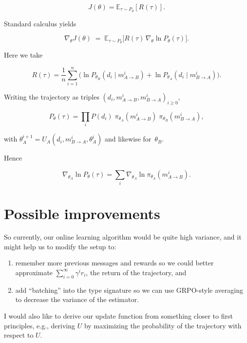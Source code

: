 \documentclass{article}
\theoremstyle{definition}
\begin{document}
$$
J(\theta)=\mathbb{E}_{\tau\sim P_\theta}[R(\tau)] .
$$

Standard calculus yields

$$
\nabla_\theta J(\theta)
\;=\;
\mathbb{E}_{\tau\sim P_\theta}\!\bigl[R(\tau)\,\nabla_\theta\ln P_\theta(\tau)\bigr].
$$

Here we take

$$
R(\tau)=\frac{1}{n}\sum_{i=1}^{n}\!
\bigl(
\ln P_{\theta_B}(d_i\mid m_{A\to B}^i)
+
\ln P_{\theta_A}(d_i\mid m_{B\to A}^i)
\bigr).
$$

Writing the trajectory as triples
$(d_i,m_{A\to B}^i,m_{B\to A}^i)_{i\ge 0}$,

$$
P_\theta(\tau)
=\prod_{i}
P(d_i)\;
\pi_{\theta_A}(m_{A\to B}^i)
\;
\pi_{\theta_B}(m_{B\to A}^i),
$$

with
$\theta_A^{i+1}=U_A(d_i,m_{B\to A}^i,\theta_A^i)$
and likewise for~$\theta_B$.

Hence

$$
\nabla_{\theta_A}\ln P_\theta(\tau)
=\sum_{i}\nabla_{\theta_A}\ln\pi_{\theta_A}(m_{A\to B}^i).
$$

\section{Possible improvements}\label{sec:improvements}

So currently, our online learning algorithm would be quite high variance, and it might help us to modify the setup to:
\begin{enumerate}
\item remember more previous messages and rewards so we could better approximate $\sum_{i=0}^{\infty} \gamma^i r_i$, the return of the trajectory, and 
\item add ``batching'' into the type signature so we can use GRPO-style averaging to decrease the variance of the estimator.
\end{enumerate}

I would also like to derive our update function from something closer to first principles, e.g., deriving $U$ by maximizing the probability of the trajectory with respect to $U$.
\end{document}
